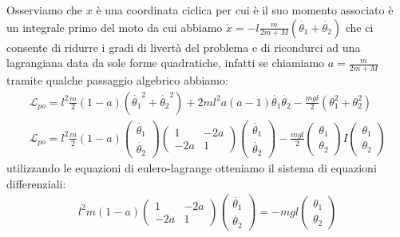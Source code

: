 Osserviamo che $x$ è una coordinata ciclica per cui è il suo momento associato è un integrale primo del moto da cui abbiamo $\dot{x}=-l\frac{m}{2m+M}(\dot{\theta_1}+\dot{\theta_2})$ che ci consente di ridurre i gradi di livertà del problema e di ricondurci ad una lagrangiana data da sole forme quadratiche, infatti se chiamiamo $a=\frac{m}{2m+M}$ tramite qualche passaggio algebrico abbiamo:
\begin{equation*}
   \begin{gathered}
   	\mathcal{L}_{po}=l^2\frac{m}{2}(1-a)(\dot{\theta_1}^2+\dot{\theta_2}^2)+2ml^2a(a-1)\dot{\theta_1}\dot{\theta_2}-\frac{mgl}{2}(\theta_1^2+\theta_2^2)\\
   	\mathcal{L}_{po}=l^2\frac{m}{2}(1-a)
   	\begin{pmatrix}
   		\dot{\theta_1} \\
   		\dot{\theta_2}
   	\end{pmatrix}
   \begin{pmatrix}
   	1 & -2a \\
   	-2a & 1
   \end{pmatrix} 
   \begin{pmatrix}
   	\dot{\theta_1} \\
   	\dot{\theta_2}
   \end{pmatrix}
   -\frac{mgl}{2}
   \begin{pmatrix}
   	\theta_1 \\
   	\theta_2
   \end{pmatrix}
   I
   \begin{pmatrix}
   	\theta_1 \\
   	\theta_2
   \end{pmatrix}
   \end{gathered}	
\end{equation*}
utilizzando le equazioni di eulero-lagrange otteniamo il sistema di equazioni differenziali:
\begin{equation*}
	\begin{gathered}
		l^2m(1-a)
		\begin{pmatrix}
			1 & -2a \\
			-2a & 1
		\end{pmatrix}
	\begin{pmatrix}
		\ddot{\theta_1} \\
		\ddot{\theta_2}
	\end{pmatrix}
    =-mgl
    \begin{pmatrix}
    	\theta_1 \\
    	\theta_2
    \end{pmatrix}
	\end{gathered}	
\end{equation*}
